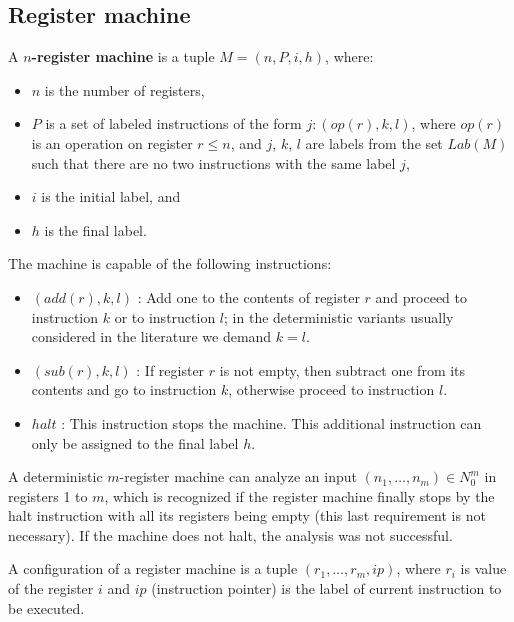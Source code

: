 \documentclass[llncs,submission,copyright,creativecommons]{../lib/lncs/llncs}
\begin{document}
\subsection{Register machine} %
\label{sub:register_machine}

\begin{definition}
  A {\bf $n$-register machine} is a tuple $M = (n,P,i,h)$, where:
  \begin{itemize}
    \item $n$ is the number of registers,
    \item $P$ is a set of labeled instructions of the form $j : (op(r),k,l)$, where $op(r)$ is an operation on register $r\leq n$, and $j$, $k$, $l$ are labels from the set $Lab(M)$ such that there are no two instructions with the same label $j$,
    \item $i$ is the initial label, and
    \item $h$ is the final label.
  \end{itemize}
\end{definition}

The machine is capable of the following instructions:
\begin{itemize}
  \item $(add(r),k,l)$ : Add one to the contents of register $r$ and proceed to instruction $k$ or to instruction $l$; in the deterministic variants usually considered in the literature we demand $k = l$.
  \item $(sub(r),k,l)$ : If register $r$ is not empty, then subtract one from its contents and go to instruction $k$, otherwise proceed to instruction $l$.
  \item $halt$ : This instruction stops the machine. This additional instruction can only be assigned to the final label $h$.
\end{itemize}

A deterministic $m$-register machine can analyze an input $(n_1,\dots,n_m)\in N_0^m$ in registers 1 to $m$, which is recognized if the register machine finally stops by the halt instruction with all its registers being empty (this last requirement is not necessary). If the machine does not halt, the analysis was not successful.

A configuration of a register machine is a tuple $(r_1, \ldots, r_m, ip)$, where $r_i$ is value of the register $i$ and $ip$ (instruction pointer) is the label of current instruction to be executed.

\end{document}
